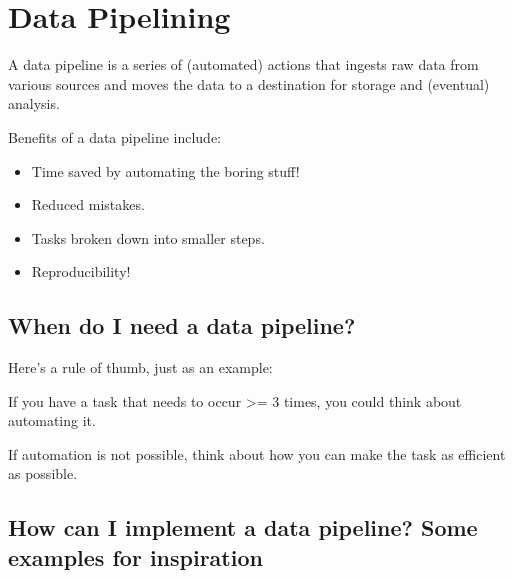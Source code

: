 \documentclass[
  letterpaper,
  DIV=11,
  numbers=noendperiod]{scrreprt}
\providecommand{\tightlist}{%
  \setlength{\itemsep}{0pt}\setlength{\parskip}{0pt}}\usepackage{longtable,booktabs,array}
\begin{document}
\chapter*{Data Pipelining}\label{data-pipelining}


A data pipeline is a series of (automated) actions that ingests raw data
from various sources and moves the data to a destination for storage and
(eventual) analysis.

Benefits of a data pipeline include:

\begin{itemize}
\tightlist
\item
  Time saved by automating the boring stuff!
\item
  Reduced mistakes.
\item
  Tasks broken down into smaller steps.
\item
  Reproducibility!
\end{itemize}

\section*{When do I need a data
pipeline?}\label{when-do-i-need-a-data-pipeline}


Here's a rule of thumb, just as an example:

If you have a task that needs to occur \textgreater= 3 times, you could
think about automating it.

If automation is not possible, think about how you can make the task as
efficient as possible.

\section*{How can I implement a data pipeline? Some examples for
inspiration}\label{how-can-i-implement-a-data-pipeline-some-examples-for-inspiration}

\end{document}
